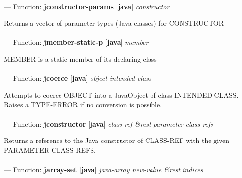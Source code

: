 \paragraph{}
\label{JAVA:JCONSTRUCTOR-PARAMS}
--- Function: \textbf{jconstructor-params} [\textbf{java}] \textit{constructor}

\begin{adjustwidth}{5em}{5em}
Returns a vector of parameter types (Java classes) for CONSTRUCTOR
\end{adjustwidth}

\paragraph{}
\label{JAVA:JMEMBER-STATIC-P}
--- Function: \textbf{jmember-static-p} [\textbf{java}] \textit{member}

\begin{adjustwidth}{5em}{5em}
MEMBER is a static member of its declaring class
\end{adjustwidth}

\paragraph{}
\label{JAVA:JCOERCE}
--- Function: \textbf{jcoerce} [\textbf{java}] \textit{object intended-class}

\begin{adjustwidth}{5em}{5em}
Attempts to coerce OBJECT into a JavaObject of class INTENDED-CLASS.  Raises a TYPE-ERROR if no conversion is possible.
\end{adjustwidth}

\paragraph{}
\label{JAVA:JCONSTRUCTOR}
--- Function: \textbf{jconstructor} [\textbf{java}] \textit{class-ref \&rest parameter-class-refs}

\begin{adjustwidth}{5em}{5em}
Returns a reference to the Java constructor of CLASS-REF with the given PARAMETER-CLASS-REFS.
\end{adjustwidth}

\paragraph{}
\label{JAVA:JARRAY-SET}
--- Function: \textbf{jarray-set} [\textbf{java}] \textit{java-array new-value \&rest indices}

